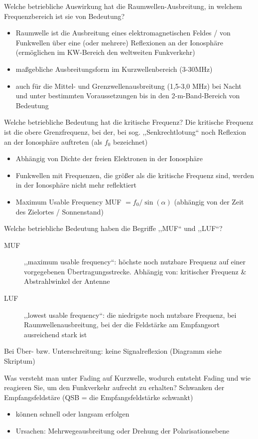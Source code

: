 \documentclass[avery5371,grid,frame,a4paper]{flashcards}
\newcommand{\card}[3]{
  \begin{flashcard}[{\chap} -- #1]{#2}#3\end{flashcard}
}
\begin{document}
\card{09}{Welche betriebliche Auswirkung hat die Raumwellen-Ausbreitung, in welchem Frequenzbereich ist sie von Bedeutung?}{
  \small
  \begin{itemize}
    \item Raumwelle ist die Ausbreitung eines elektromagnetischen Feldes / von Funkwellen über eine (oder mehrere) Reflexionen an der Ionosphäre (ermöglichen im KW-Bereich den weltweiten Funkverkehr)
    \item maßgebliche Ausbreitungsform im Kurzwellenbereich (3-30MHz)
    \item auch für die Mittel- und Grenzwellenausbreitung (1,5-3,0 MHz) bei Nacht und unter bestimmten Voraussetzungen bis in den 2-m-Band-Bereich von Bedeutung
  \end{itemize}
}
\card{10}{Welche betriebliche Bedeutung hat die kritische Frequenz?}{
  \small
  Die kritische Frequenz ist die obere Grenzfrequenz, bei der, bei sog. ,,Senkrechtlotung`` noch Reflexion an der Ionosphäre auftreten (als $f_0$ bezeichnet)
  \begin{itemize}
    \item Abhängig von Dichte der freien Elektronen in der Ionosphäre
    \item Funkwellen mit Frequenzen, die größer als die kritische Frequenz sind, werden in der Ionosphäre nicht mehr reflektiert
    \item Maximum Usable Frequency MUF $= f_0 / \sin(\alpha)$ (abhängig von der Zeit des Zielortes / Sonnenstand)
  \end{itemize}
}
\card{11}{Welche betriebliche Bedeutung haben die Begriffe ,,MUF`` und ,,LUF``?}{
  \small
  \begin{description}
    \item[MUF] ,,maximum usable frequency``: höchste noch nutzbare Frequenz auf einer vorgegebenen Übertragungsstrecke. Abhängig von: kritischer Frequenz \& Abstrahlwinkel der Antenne
    \item[LUF] ,,lowest usable frequency``: die niedrigste noch nutzbare Frequenz, bei Raumwellenausbreitung, bei der die Feldstärke am Empfangsort ausreichend stark ist
  \end{description}
  Bei Über- bzw. Unterschreitung: keine Signalreflexion (Diagramm siehe Skriptum)
}
\card{12}{Was versteht man unter Fading auf Kurzwelle, wodurch entsteht Fading und wie reagieren Sie, um den Funkverkehr aufrecht zu erhalten?}{
  Schwanken der Empfangsfeldstäre (QSB = die Empfangsfeldstärke schwankt)
  \begin{itemize}
    \item können schnell oder langsam erfolgen
    \item Ursachen: Mehrwegeausbreitung oder Drehung der Polarisationsebene
  \end{itemize}
}
\end{document}
